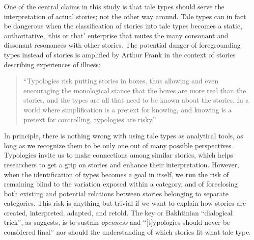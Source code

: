 One of the central claims in this study is that tale types should serve the interpretation of actual stories; not the other way around. Tale types can in fact be dangerous when the classification of stories into tale types becomes a static, authoritative, `this or that' enterprise that mutes the many consonant and dissonant resonances with other stories\autocite[Cf.][]{frank:2010}. The potential danger of foregrounding types instead of stories is amplified by Arthur Frank in the context of stories describing experiences of illness:
\begin{quote}
  \noindent ``Typologies risk putting stories in boxes, thus allowing and even encouraging the monological stance that the boxes are more real than the stories, and the types are all that need to be known about the stories. In a world where simplification is a pretext for knowing, and knowing is a pretext for controlling, typologies are risky.''\autocite[118--119]{frank:2010}
\end{quote}
In principle, there is nothing wrong with using tale types as analytical tools, as long as we recognize them to be only one out of many possible perspectives. Typologies invite us to make connections among similar stories, which helps researchers to get a grip on stories and enhance their interpretation. However, when the identification of types becomes a goal in itself, we run the risk of remaining blind to the variation exposed within a category, and of foreclosing both existing and potential relations between stories belonging to separate categories. This risk is anything but trivial if we want to explain how stories are created, interpreted, adapted, and retold. The key or Bakhtinian ``dialogical trick'', as \citeauthor{frank:2010} suggests, is to sustain \emph{openness} and ``[t]ypologies should never be considered final''\autocite[119, 121]{frank:2010} nor should the understanding of which stories fit what tale type.

